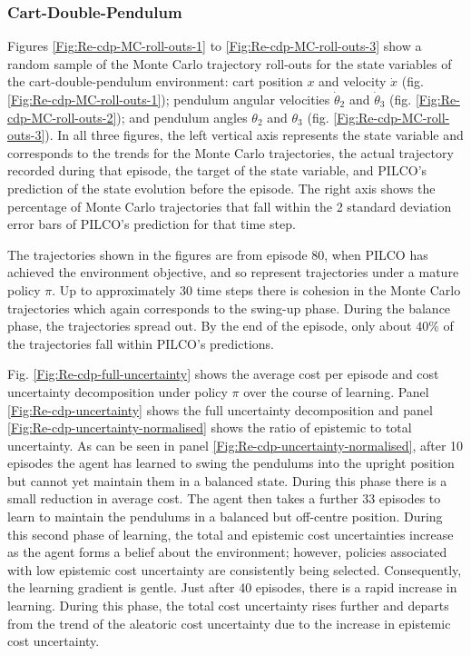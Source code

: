 \subsubsection{Cart-Double-Pendulum}
Figures \ref{Fig:Re-cdp-MC-roll-outs-1} to \ref{Fig:Re-cdp-MC-roll-outs-3} show a random sample of the Monte Carlo trajectory roll-outs for the state variables of the cart-double-pendulum environment: cart position $x$ and velocity $\dot x$ (fig. \ref{Fig:Re-cdp-MC-roll-outs-1}); pendulum angular velocities $\dot{\theta}_{2}$ and $\dot{\theta}_{3}$ (fig. \ref{Fig:Re-cdp-MC-roll-outs-2}); and pendulum angles $\theta_{2}$ and $\theta_{3}$ (fig. \ref{Fig:Re-cdp-MC-roll-outs-3}). In all three figures, the left vertical axis represents the state variable and corresponds to the trends for the Monte Carlo trajectories, the actual trajectory recorded during that episode, the target of the state variable, and PILCO's prediction of the state evolution before the episode. The right axis shows the percentage of Monte Carlo trajectories that fall within the 2 standard deviation error bars of PILCO's prediction for that time step. 

The trajectories shown in the figures are from episode 80, when PILCO has achieved the environment objective, and so represent trajectories under a mature policy $\pi$. Up to approximately 30 time steps there is cohesion in the Monte Carlo trajectories which again corresponds to the swing-up phase. During the balance phase, the trajectories spread out. By the end of the episode, only about $40\%$ of the trajectories fall within PILCO's predictions. 

Fig. \ref{Fig:Re-cdp-full-uncertainty} shows the average cost per episode and cost uncertainty decomposition under policy $\pi$ over the course of learning. Panel \ref{Fig:Re-cdp-uncertainty} shows the full uncertainty decomposition and panel \ref{Fig:Re-cdp-uncertainty-normalised} shows the ratio of epistemic to total uncertainty. As can be seen in panel \ref{Fig:Re-cdp-uncertainty-normalised}, after 10 episodes the agent has learned to swing the pendulums into the upright position but cannot yet maintain them in a balanced state. During this phase there is a small reduction in average cost. The agent then takes a further 33 episodes to learn to maintain the pendulums in a balanced but off-centre position. During this second phase of learning, the total and epistemic cost uncertainties increase as the agent forms a belief about the environment; however, policies associated with low epistemic cost uncertainty are consistently being selected. Consequently, the learning gradient is gentle. Just after 40 episodes, there is a rapid increase in learning. During this phase, the total cost uncertainty rises further and departs from the trend  of the aleatoric cost uncertainty due to the increase in epistemic cost uncertainty. 

